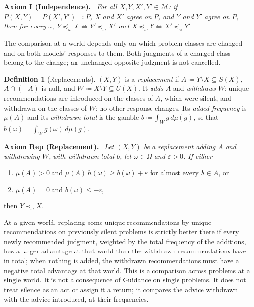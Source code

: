 \documentclass[11pt]{article}
\theoremstyle{definition}
\newtheorem{definition}[theorem]{Definition}
\theoremstyle{remark}
\newenvironment{axiom}[1]{\par\medskip\noindent\textbf{Axiom #1.}\ \itshape}{\par\medskip}
\newcommand{\M}{\mathcal M}
\begin{document}
\begin{axiom}{I (Independence)}
For all $X,Y,X',Y'\in\M$: if $P(X,Y)=P(X',Y')\eqqcolon P$, $X$ and $X'$ agree on $P$, and $Y$ and $Y'$ agree on $P$, then for every $\omega$, $Y\preceq_\omega X\iff Y'\preceq_\omega X'$ and $X\preceq_\omega Y\iff X'\preceq_\omega Y'$.
\end{axiom}
\noindent The comparison at a world depends only on which problem classes are changed and on both models' responses to them. Both judgments of a changed class belong to the change; an unchanged opposite judgment is not cancelled.

\begin{definition}[Replacements]\label{def:replacement}
$(X,Y)$ is a \emph{replacement} if $A\coloneqq Y\setminus X\subseteq S(X)$, $A\cap(-A)$ is null, and $W\coloneqq X\setminus Y\subseteq U(X)$. It \emph{adds} $A$ and \emph{withdraws} $W$: unique recommendations are introduced on the classes of $A$, which were silent, and withdrawn on the classes of $W$; no other response changes. Its \emph{added frequency} is $\mu(A)$ and its \emph{withdrawn total} is the gamble $b\coloneqq\int_Wg\,d\mu(g)$, so that $b(\omega)=\int_Wg(\omega)\,d\mu(g)$.
\end{definition}

\begin{axiom}{Rep (Replacement)}
Let $(X,Y)$ be a replacement adding $A$ and withdrawing $W$, with withdrawn total $b$, let $\omega\in\Omega$ and $\varepsilon>0$. If either
\begin{enumerate}[label=(\alph*)]
\item $\mu(A)>0$ and $\mu(A)\,h(\omega)\ge b(\omega)+\varepsilon$ for almost every $h\in A$, or
\item $\mu(A)=0$ and $b(\omega)\le-\varepsilon$,
\end{enumerate}
then $Y\prec_\omega X$.
\end{axiom}
\noindent At a given world, replacing some unique recommendations by unique recommendations on previously silent problems is strictly better there if every newly recommended judgment, weighted by the total frequency of the additions, has a larger advantage at that world than the withdrawn recommendations have in total; when nothing is added, the withdrawn recommendations must have a negative total advantage at that world. This is a comparison across problems at a single world. It is not a consequence of Guidance on single problems. It does not treat silence as an act or assign it a return; it compares the advice withdrawn with the advice introduced, at their frequencies.
\end{document}
